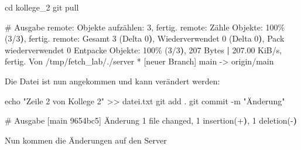 \documentclass[
  ngerman,
  letterpaper,
  DIV=11]{scrreprt}
\newenvironment{Shaded}{\begin{snugshade}}{\end{snugshade}}
\newcommand{\AttributeTok}[1]{\textcolor[rgb]{0.40,0.45,0.13}{#1}}
\newcommand{\BuiltInTok}[1]{\textcolor[rgb]{0.00,0.23,0.31}{#1}}
\newcommand{\CommentTok}[1]{\textcolor[rgb]{0.37,0.37,0.37}{#1}}
\newcommand{\ErrorTok}[1]{\textcolor[rgb]{0.68,0.00,0.00}{#1}}
\newcommand{\ExtensionTok}[1]{\textcolor[rgb]{0.00,0.23,0.31}{#1}}
\newcommand{\FunctionTok}[1]{\textcolor[rgb]{0.28,0.35,0.67}{#1}}
\newcommand{\KeywordTok}[1]{\textcolor[rgb]{0.00,0.23,0.31}{\textbf{#1}}}
\newcommand{\NormalTok}[1]{\textcolor[rgb]{0.00,0.23,0.31}{#1}}
\newcommand{\OperatorTok}[1]{\textcolor[rgb]{0.37,0.37,0.37}{#1}}
\newcommand{\StringTok}[1]{\textcolor[rgb]{0.13,0.47,0.30}{#1}}
\begin{document}
\begin{Shaded}
\begin{Highlighting}[]
\BuiltInTok{cd}\NormalTok{ kollege\_2}
\FunctionTok{git}\NormalTok{ pull}

\CommentTok{\# Ausgabe }
\ExtensionTok{remote:}\NormalTok{ Objekte aufzählen: 3, fertig.}
\ExtensionTok{remote:}\NormalTok{ Zähle Objekte: 100\% }\ErrorTok{(}\ExtensionTok{3/3}\KeywordTok{)}\ExtensionTok{,}\NormalTok{ fertig.}
\ExtensionTok{remote:}\NormalTok{ Gesamt 3 }\ErrorTok{(}\ExtensionTok{Delta}\NormalTok{ 0}\KeywordTok{)}\ExtensionTok{,}\NormalTok{ Wiederverwendet 0 }\ErrorTok{(}\ExtensionTok{Delta}\NormalTok{ 0}\KeywordTok{)}\ExtensionTok{,}\NormalTok{ Pack wiederverwendet 0}
\ExtensionTok{Entpacke}\NormalTok{ Objekte: 100\% }\ErrorTok{(}\ExtensionTok{3/3}\KeywordTok{)}\ExtensionTok{,}\NormalTok{ 207 Bytes }\KeywordTok{|} \ExtensionTok{207.00}\NormalTok{ KiB/s, fertig.}
\ExtensionTok{Von}\NormalTok{ /tmp/fetch\_lab/./server}
 \ExtensionTok{*}\NormalTok{ [neuer Branch]    main       }\AttributeTok{{-}}\OperatorTok{\textgreater{}}\NormalTok{ origin/main}
\end{Highlighting}
\end{Shaded}

Die Datei ist nun angekommen und kann verändert werden:

\begin{Shaded}
\begin{Highlighting}[]
\BuiltInTok{echo} \StringTok{"Zeile 2 von Kollege 2"} \OperatorTok{\textgreater{}\textgreater{}}\NormalTok{ datei.txt}
\FunctionTok{git}\NormalTok{ add .}
\FunctionTok{git}\NormalTok{ commit }\AttributeTok{{-}m} \StringTok{"Änderung"}

\CommentTok{\# Ausgabe }
\ExtensionTok{[main}\NormalTok{ 9654bc5] Änderung}
 \ExtensionTok{1}\NormalTok{ file changed, 1 insertion}\ErrorTok{(}\ExtensionTok{+}\KeywordTok{)}\ExtensionTok{,}\NormalTok{ 1 deletion}\ErrorTok{(}\ExtensionTok{{-}}\KeywordTok{)}
\end{Highlighting}
\end{Shaded}

Nun kommen die Änderungen auf den Server
\end{document}
